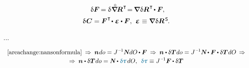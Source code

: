 \begin{otherlanguage}{russian}
\begin{equation}
\begin{array}{c}
\:\,
\variation{\bm{F}} \hspace{-0.2ex} = \variation{\hspace{.1ex} \boldnablacircled \hspace{-0.16ex} \bm{R}^{\hspace{0.12ex}\T}} \hspace{-0.4ex}
= \hspace{-0.2ex} \boldnabla \hspace{.1ex} \variation{\bm{R}}^{\hspace{0.12ex}\T} \hspace{-0.25ex} \dotp \bm{F}
\hspace{-0.1ex} ,
\\[.5em]
%
\variation{\hspace{.12ex}\bm{C}} = \bm{F}^{\hspace{.1ex}\T} \hspace{-0.32ex} \dotp \hspace{.1ex} \mathboldepsilon \dotp \bm{F} ,
\:\,
\mathboldepsilon \hspace{0.1ex} \equiv \boldnabla \hspace{.1ex} \variation{\bm{R}}^{\hspace{.25ex}\mathsf{S}} \hspace{-0.2ex} .
\end{array}
\end{equation}

...

\begin{equation*}\begin{array}{c}
\eqref{areachange:nansonformula}
\:\Rightarrow\:
%
\bm{n} \hspace{.1ex} do = J^{\hspace{.12ex}\expminusone} \mathboldN \hspace{.1ex} dO \hspace{-0.1ex} \dotp \bm{F}
\:\Rightarrow\:
%
\bm{n} \dotp \variation{\firstpiolakirchhoffstress} \hspace{.1ex} do
= J^{\hspace{.12ex}\expminusone} \mathboldN \hspace{-0.1ex} \dotp \bm{F} \hspace{-0.1ex} \dotp \variation{\firstpiolakirchhoffstress} \hspace{.1ex} dO
\,\Rightarrow
\\[.2em]
%
\Rightarrow\:
\bm{n} \dotp \variation{\firstpiolakirchhoffstress} \hspace{.1ex} do
= \mathboldN \dotp \varbivalent{\hspace{-0.2ex}\cauchystress} \hspace{.25ex} dO ,
\:\:
\varbivalent{\hspace{-0.2ex}\cauchystress} \equiv J^{\hspace{.12ex}\expminusone} \bm{F} \hspace{-0.1ex} \dotp \variation{\firstpiolakirchhoffstress}
\end{array}\end{equation*}


\end{otherlanguage}
